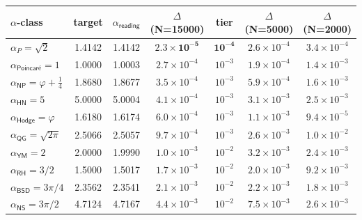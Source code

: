 \documentclass[11pt,a4paper]{amsart}
\theoremstyle{plain}
\theoremstyle{definition}
\begin{document}
\begin{center}
\begin{tabular}{lcccccc}
\toprule
$\alpha$-class & target & $\alpha_{\textsf{reading}}$ & $\Delta$ (N=15000) & tier & $\Delta$ (N=5000) & $\Delta$ (N=2000) \\
\midrule
$\alpha_P = \sqrt{2}$ & 1.4142 & 1.4142 & $\mathbf{2.3\times 10^{-5}}$ & $\mathbf{10^{-4}}$ & $2.6\times 10^{-4}$ & $3.4\times 10^{-4}$ \\
$\alpha_{\textsf{Poincar\'e}} = 1$ & 1.0000 & 1.0003 & $2.7\times 10^{-4}$ & $10^{-3}$ & $1.9\times 10^{-4}$ & $1.4\times 10^{-3}$ \\
$\alpha_{\textsf{NP}} = \varphi + \tfrac{1}{4}$ & 1.8680 & 1.8677 & $3.5\times 10^{-4}$ & $10^{-3}$ & $5.9\times 10^{-4}$ & $1.6\times 10^{-3}$ \\
$\alpha_{\textsf{HN}} = 5$ & 5.0000 & 5.0004 & $4.1\times 10^{-4}$ & $10^{-3}$ & $3.1\times 10^{-3}$ & $2.5\times 10^{-3}$ \\
$\alpha_{\textsf{Hodge}} = \varphi$ & 1.6180 & 1.6174 & $6.0\times 10^{-4}$ & $10^{-3}$ & $1.1\times 10^{-3}$ & $9.4\times 10^{-5}$ \\
$\alpha_{\textsf{QG}} = \sqrt{2\pi}$ & 2.5066 & 2.5057 & $9.7\times 10^{-4}$ & $10^{-3}$ & $2.6\times 10^{-3}$ & $1.0\times 10^{-2}$ \\
$\alpha_{\textsf{YM}} = 2$ & 2.0000 & 1.9990 & $1.0\times 10^{-3}$ & $10^{-2}$ & $3.2\times 10^{-3}$ & $2.4\times 10^{-3}$ \\
$\alpha_{\textsf{RH}} = 3/2$ & 1.5000 & 1.5017 & $1.7\times 10^{-3}$ & $10^{-2}$ & $2.0\times 10^{-3}$ & $9.2\times 10^{-3}$ \\
$\alpha_{\textsf{BSD}} = 3\pi/4$ & 2.3562 & 2.3541 & $2.1\times 10^{-3}$ & $10^{-2}$ & $2.2\times 10^{-3}$ & $1.8\times 10^{-3}$ \\
$\alpha_{\textsf{NS}} = 3\pi/2$ & 4.7124 & 4.7167 & $4.4\times 10^{-3}$ & $10^{-2}$ & $7.5\times 10^{-3}$ & $2.6\times 10^{-3}$ \\
\bottomrule
\end{tabular}
\end{center}
\end{document}
